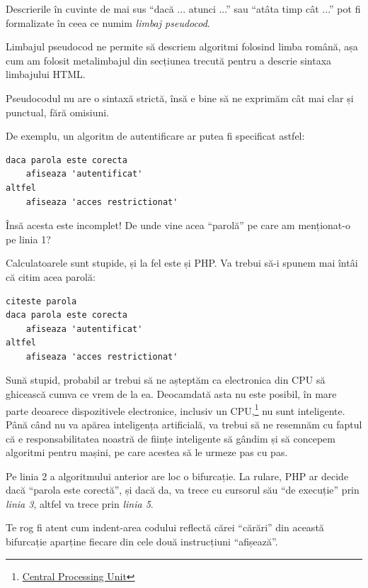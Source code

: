 Descrierile în cuvinte de mai sus ``dacă ... atunci ...''
sau ``atâta timp cât ...'' pot fi formalizate în ceea
ce numim \textsl{limbaj pseudocod}. 

Limbajul pseudocod ne permite să descriem algoritmi
folosind limba română, așa cum am folosit metalimbajul
din secțiunea trecută pentru a descrie sintaxa limbajului HTML.

Pseudocodul nu are o sintaxă strictă, însă e bine să
ne exprimăm cât mai clar și punctual, fără omisiuni.

De exemplu, un algoritm de autentificare ar putea
fi specificat astfel:
\begin{lstlisting}[language=pseudocode]
daca parola este corecta
	afiseaza 'autentificat'
altfel
	afiseaza 'acces restrictionat'
\end{lstlisting}
Însă acesta este incomplet! De unde vine
acea ``parolă'' pe care am menționat-o pe linia 1?

Calculatoarele sunt stupide, și la fel este și PHP. Va
trebui să-i spunem mai întâi că citim acea parolă:
\begin{lstlisting}[language=pseudocode]
citeste parola
daca parola este corecta
	afiseaza 'autentificat'
altfel
	afiseaza 'acces restrictionat'
\end{lstlisting}

Sună stupid, probabil ar trebui să ne așteptăm
ca electronica din CPU să ghicească cumva
ce vrem de la ea. Deocamdată asta nu este posibil,
în mare parte deoarece dispozitivele electronice,
inclusiv un
CPU,\footnote{\href{http://en.wikipedia.org/wiki/Central_processing_unit}{Central Processing Unit}} nu sunt inteligente.
Până când nu va apărea inteligența artificială,
va trebui să ne resemnăm cu faptul că e responsabilitatea
noastră de ființe inteligente să gândim și să
concepem algoritmi pentru mașini, pe care
acestea să le urmeze pas cu pas.

Pe linia 2 a algoritmului anterior are loc o bifurcație.
La rulare, PHP ar decide dacă ``parola este corectă'', și dacă
da, va trece cu cursorul său ``de execuție'' prin \textit{linia 3},
altfel va trece prin \textit{linia 5}. 

Te rog fi atent cum indent-area codului reflectă cărei ``cărări''
din această bifurcație aparține fiecare din cele două instrucțiuni
``afișează''.

